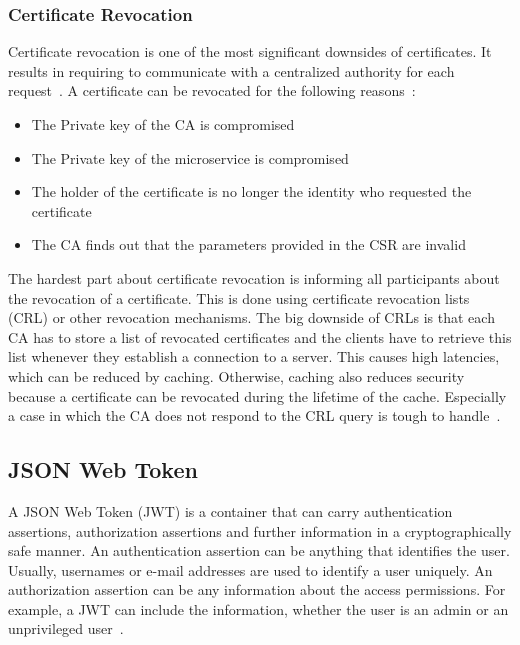 \subsubsection{Certificate Revocation}
Certificate revocation is one of the most significant downsides of certificates.
It results in requiring to communicate with a centralized authority for each request~\cite{dias2020microservices}.
A certificate can be revocated for the following reasons~\cite{dias2020microservices}: 
\begin{itemize}
    \item The Private key of the CA is compromised
    \item The Private key of the microservice is compromised
    \item The holder of the certificate is no longer the identity who requested the certificate 
    \item The CA finds out that the parameters provided in the CSR are invalid
\end{itemize}
The hardest part about certificate revocation is informing all participants about the revocation of a certificate.
This is done using certificate revocation lists (CRL) or other revocation mechanisms.
The big downside of CRLs is that each CA has to store a list of revocated certificates and the clients have to retrieve this list whenever they establish a connection to a server.
This causes high latencies, which can be reduced by caching.
Otherwise, caching also reduces security because a certificate can be revocated during the lifetime of the cache.
Especially a case in which the CA does not respond to the CRL query is tough to handle~\cite{dias2020microservices}.


\subsection{JSON Web Token}
A JSON Web Token (JWT) is a container that can carry authentication assertions, authorization assertions and further information in a cryptographically safe manner.
An authentication assertion can be anything that identifies the user.
Usually, usernames or e-mail addresses are used to identify a user uniquely.
An authorization assertion can be any information about the access permissions.
For example, a JWT can include the information, whether the user is an admin or an unprivileged user~\cite{dias2020microservices}. 

